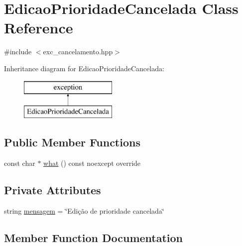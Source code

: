 \hypertarget{classEdicaoPrioridadeCancelada}{}\section{Edicao\+Prioridade\+Cancelada Class Reference}
\label{classEdicaoPrioridadeCancelada}


{\ttfamily \#include $<$exc\+\_\+cancelamento.\+hpp$>$}

Inheritance diagram for Edicao\+Prioridade\+Cancelada\+:\begin{figure}[H]
\begin{center}
\leavevmode
\includegraphics[height=2.000000cm]{classEdicaoPrioridadeCancelada}
\end{center}
\end{figure}
\subsection*{Public Member Functions}
\begin{DoxyCompactItemize}
\item 
const char $\ast$ \hyperlink{classEdicaoPrioridadeCancelada_a40a8af51b8b5e2c3c92b372e4c25edc3}{what} () const noexcept override
\end{DoxyCompactItemize}
\subsection*{Private Attributes}
\begin{DoxyCompactItemize}
\item 
string \hyperlink{classEdicaoPrioridadeCancelada_aa394e119ef20d94ce5ba0633dc0294d2}{mensagem} = \char`\"{}Edição de prioridade cancelada\char`\"{}
\end{DoxyCompactItemize}


\subsection{Member Function Documentation}
\mbox{\label{classEdicaoPrioridadeCancelada_a40a8af51b8b5e2c3c92b372e4c25edc3}} 
